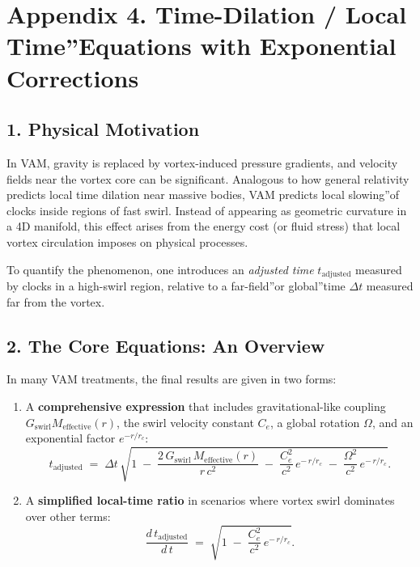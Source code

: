 

\section*{Appendix 4. Time-Dilation / \grqq Local Time\textquotedblright Equations with Exponential Corrections}

\subsection*{1. Physical Motivation}

In VAM, gravity is replaced by vortex-induced pressure gradients, and velocity fields near the vortex core can be significant. Analogous to how general relativity predicts local time dilation near massive bodies, VAM predicts local \grqq slowing\textquotedblright of clocks inside regions of fast swirl. Instead of appearing as geometric curvature in a 4D manifold, this effect arises from the energy cost (or fluid stress) that local vortex circulation imposes on physical processes.

To quantify the phenomenon, one introduces an \textit{adjusted time} \(t_\text{adjusted}\) measured by clocks in a high-swirl region, relative to a \grqq far-field\textquotedblright or \grqq global\textquotedblright time \(\Delta t\) measured far from the vortex.

\subsection*{2. The Core Equations: An Overview}

In many VAM treatments, the final results are given in two forms:

\begin{enumerate}
    \item A \textbf{comprehensive expression} that includes gravitational-like coupling \(G_\text{swirl} M_\text{effective}(r)\), the swirl velocity constant \(C_e\), a global rotation \(\Omega\), and an exponential factor \(e^{-r/r_c}\):
    \[
        t_\text{adjusted}
        \;=\;
        \Delta t \,\sqrt{
            1
            \;-\;
            \frac{2\,G_\text{swirl}\,M_\text{effective}(r)}{r\,c^2}
            \;-\;
            \frac{C_e^2}{c^2}\, e^{-\,r/r_c}
            \;-\;
            \frac{\Omega^2}{c^2}\, e^{-\,r/r_c}
        }.
    \]
    \item A \textbf{simplified local-time ratio} in scenarios where vortex swirl dominates over other terms:
    \[
        \frac{d\,t_\text{adjusted}}{d\,t}
        \;=\;
        \sqrt{
            1
            \;-\;
            \frac{C_e^2}{c^2}\, e^{-\,r/r_c}
        }.
    \]
\end{enumerate}

